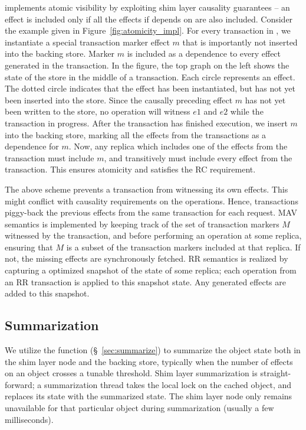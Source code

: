 \name implements atomic visibility by exploiting shim layer causality guarantees
-- an effect is included only if all the effects if depends on are also
included. Consider the example given in Figure~\ref{fig:atomicity_impl}. For
every transaction in \name, we instantiate a special transaction marker
effect $m$ that is importantly not inserted into the backing store. Marker $m$ is
included as a dependence to every effect generated in the transaction. In the
figure, the top graph on the left shows the state of the store in the middle of a
transaction. Each circle represents an effect. The dotted circle indicates that
the effect has been instantiated, but has not yet been inserted into the store.
Since the causally preceding effect $m$ has not yet been written to the store,
no operation will witness $e1$ and $e2$ while the transaction in progress.
After the transaction has finished execution, we insert $m$ into the backing
store, marking all the effects from the transactions as a dependence for $m$.
Now, any replica which includes one of the effects from the transaction must
include $m$, and transitively must include every effect from the transaction.
This ensures atomicity and satisfies the RC requirement.

The above scheme prevents a transaction from witnessing its own effects. This
might conflict with causality requirements on the operations. Hence,
transactions piggy-back the previous effects from the same transaction for each
request. MAV semantics is implemented by keeping track of the set of
transaction markers $M$ witnessed by the transaction, and before performing an
operation at some replica, ensuring that $M$ is a subset of the transaction
markers included at that replica. If not, the missing effects are synchronously
fetched. RR semantics is realized by capturing a optimized snapshot of the
state of some replica; each operation from an RR transaction is applied to this
snapshot state. Any generated effects are added to this snapshot.

\subsection{Summarization}

We utilize the  function (\S~\ref{sec:summarize}) to summarize
the object state both in the shim layer node and the backing store, typically
when the number of effects on an object crosses a tunable threshold.
Shim layer summarization is straight-forward; a summarization thread takes the
local lock on the cached object, and replaces its state with the summarized
state. The shim layer node only remains unavailable for that particular object
during summarization (usually a few milliseconds).

